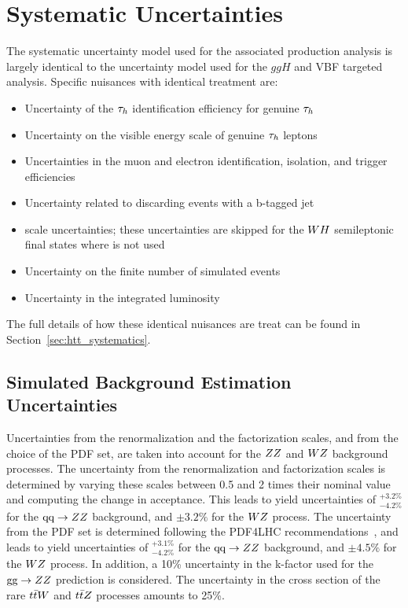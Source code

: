 \section{Systematic Uncertainties}
\label{sec:vh_systematics}
The systematic uncertainty model used for the associated production analysis is largely
identical to the uncertainty model used for the $ggH$ and VBF targeted analysis.
Specific nuisances with identical treatment are:
\begin{itemize}
\item Uncertainty of the $\tau_{h}$ identification efficiency for genuine $\tau_{h}$
\item Uncertainty on the visible energy scale of genuine $\tau_{h}$ leptons
\item Uncertainties in the muon and electron identification, isolation, and trigger efficiencies
\item Uncertainty related to discarding events with a b-tagged jet
\item \etvecmiss scale uncertainties; these uncertainties are skipped for the
$WH$ semileptonic final states where \etvecmiss is not used
\item Uncertainty on the finite number of simulated events
\item Uncertainty in the integrated luminosity
\end{itemize}
The full details of how these identical nuisances are treat can be found in
Section~\ref{sec:htt_systematics}.


\subsection{Simulated Background Estimation Uncertainties}
Uncertainties from the renormalization and the factorization scales, and from the 
choice of the PDF set, are taken into account for the $ZZ$ and $WZ$ 
background processes. The uncertainty from the renormalization and factorization 
scales is determined by varying these scales between 0.5 and 2 times their nominal 
value and computing the change in acceptance. This leads to yield uncertainties 
of $^{+3.2\%}_{-4.2\%}$ for the $\text{q}\text{q}\rightarrow ZZ$ background, and $\pm 3.2\%$ 
for the $WZ$ process. The uncertainty from the PDF set is determined following 
the PDF4LHC recommendations~\cite{Butterworth:2015oua}, and leads to yield uncertainties of $^{+3.1\%}_{-4.2\%}$ for 
the $\text{q}\text{q}\rightarrow ZZ$ background, and $\pm 4.5\%$ for the $WZ$ process. 
In addition, a 10\% uncertainty in the k-factor used for the $\text{g}\text{g} \rightarrow 
ZZ$ prediction is considered. The uncertainty in the cross section of the 
rare $t\bar{t}W$ and $t\bar{t}Z$ processes amounts to 25\%.

